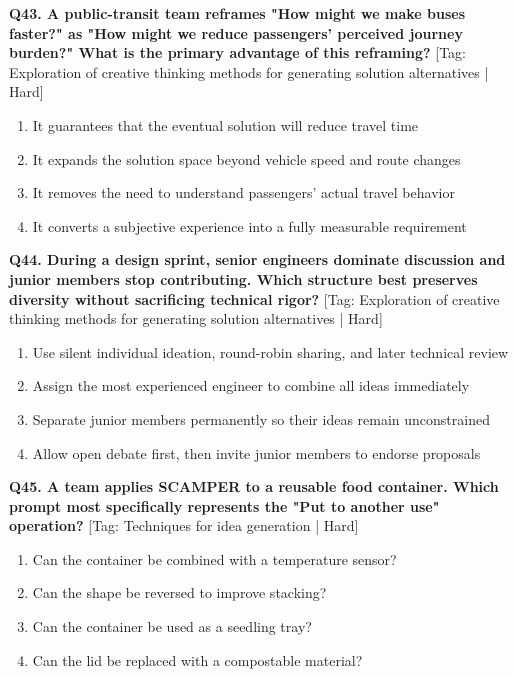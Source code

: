\noindent\textbf{Q43. A public-transit team reframes "How might we make buses faster?" as "How might we reduce passengers' perceived journey burden?" What is the primary advantage of this reframing?} \hfill [Tag: Exploration of creative thinking methods for generating solution alternatives | Hard]
\begin{enumerate}[label=(\alph*),topsep=2pt,itemsep=1pt,partopsep=0pt,parsep=0pt]
    \item {It guarantees that the eventual solution will reduce travel time}
    \item {It expands the solution space beyond vehicle speed and route changes}
    \item {It removes the need to understand passengers' actual travel behavior}
    \item {It converts a subjective experience into a fully measurable requirement}
\end{enumerate}
\vspace{2mm}

\noindent\textbf{Q44. During a design sprint, senior engineers dominate discussion and junior members stop contributing. Which structure best preserves diversity without sacrificing technical rigor?} \hfill [Tag: Exploration of creative thinking methods for generating solution alternatives | Hard]
\begin{enumerate}[label=(\alph*),topsep=2pt,itemsep=1pt,partopsep=0pt,parsep=0pt]
    \item {Use silent individual ideation, round-robin sharing, and later technical review}
    \item {Assign the most experienced engineer to combine all ideas immediately}
    \item {Separate junior members permanently so their ideas remain unconstrained}
    \item {Allow open debate first, then invite junior members to endorse proposals}
\end{enumerate}
\vspace{2mm}

\noindent\textbf{Q45. A team applies SCAMPER to a reusable food container. Which prompt most specifically represents the "Put to another use" operation?} \hfill [Tag: Techniques for idea generation | Hard]
\begin{enumerate}[label=(\alph*),topsep=2pt,itemsep=1pt,partopsep=0pt,parsep=0pt]
    \item {Can the container be combined with a temperature sensor?}
    \item {Can the shape be reversed to improve stacking?}
    \item {Can the container be used as a seedling tray?}
    \item {Can the lid be replaced with a compostable material?}
\end{enumerate}
\vspace{2mm}

